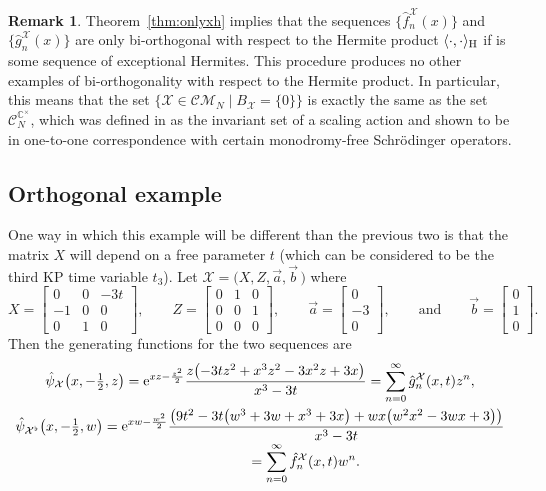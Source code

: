 \documentclass[10pt,a4paper]{amsart}
\numberwithin{equation}{section}
\theoremstyle{definition}
\newtheorem{Remark}[Theorem]{Remark}
\def\X{\mathcal{X}}
\def\CM{\mathcal{C\!M}}
\def\C{\mathbb{C}}
\def\ff{\hat f}
\def\gg{\hat g}
\begin{document}
 \begin{Remark}
 Theorem~\ref{thm:onlyxh} implies that the sequences $\big\{\ff_n^{\X}(x)\big\}$ and $\big\{\gg_n^{\X}(x)\big\}$ are only
bi-orthogonal with respect to the Hermite product
$\langle\cdot,\cdot\rangle_{\rm H}$ if
\smash{$\big\{\ff_n^{\X}(x)\big\}=\big\{\gg_n^{\X}(x)\big\}=\big\{\hat h_n^\lambda(x)\big\}$} is some
sequence of exceptional Hermites.
This procedure produces no other examples of bi-orthogonality with respect to
the Hermite product. In particular, this means that the
set $\{\X\in\CM_N\mid B_{\X}=\{0\}\}$ is
exactly the same as the set $\mathcal{C}_N^{\C^\times}$, which was defined in
\cite{ScaleInvar} as the invariant set of a scaling action and shown
to be in one-to-one correspondence with certain monodromy-free
Schr\"odinger operators.
\end{Remark}

\subsection{Orthogonal example}

One way in which this example will be different than the previous two is that the matrix $X$ will depend
on a free parameter $t$ (which can be considered to be the third KP
time variable $t_3$). Let $\X=\bigl(X,Z,\vec a,\vec b\,\bigr)$ where
\[
X=\left[\begin{matrix} 0 & 0 & -3 t \\
 -1 & 0 & 0 \\
 0 & 1 & 0\end{matrix}\right],
\qquad
Z=\left[\begin{matrix} 0 & 1 & 0 \\
 0 & 0 & 1 \\
 0 & 0 & 0 \end{matrix}\right],
\qquad
\vec a= \left[\begin{matrix} 0 \\
 -3 \\
 0 \end{matrix}\right],
\qquad\text{and}\qquad
\vec b=\left[\begin{matrix} 0 \\
 1 \\
 0 \end{matrix}\right].
\]
Then the generating functions for the two sequences are
\begin{gather*}
\hat\psi_{\X}\bigl(x,-\tfrac{1}{2},z\bigr)={\rm e}^{x z-\frac{z^2}{2}}\frac{z
 \bigl(-3 t z^2+x^3 z^2-3 x^2
 z+3 x\bigr)}{x^3-3 t}=\sum_{n=0}^{\infty}\gg_n^{\X}(x,t)z^n,
\\
\hat\psi_{\X^\flat}\bigl(x,-\tfrac{1}{2},w\bigr) ={\rm e}^{xw-\frac{w^2}{2}}\frac{
 \bigl(9 t^2-3 t \bigl(w^3+3
 w+x^3+3 x\bigr)+w x \bigl(w^2
 x^2-3 w
 x+3\bigr)\bigr)}{x^3-3 t}\\[-1mm]
\hphantom{\hat\psi_{\X^\flat}\bigl(x,-\tfrac{1}{2},w\bigr)}{} =\sum_{n=0}^{\infty}\ff_n^{\X}(x,t)w^n.
\end{gather*}
\end{document}
